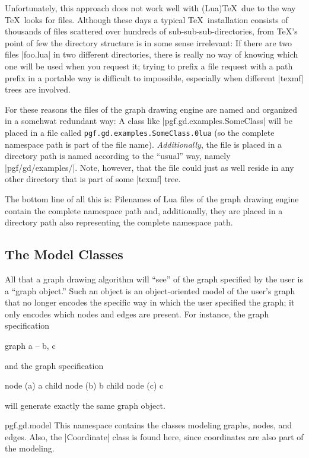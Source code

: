Unfortunately, this approach does not work well with (Lua)\TeX\ due to
the way \TeX\ looks for files. Although these days a typical \TeX\
installation consists of thousands of files scattered over hundreds of
sub-sub-sub-directories, from \TeX's point of few the directory
structure is in some sense irrelevant: If there are two files
|foo.lua| in two different directories, there is really no way of
knowing which one will be used when you request it; trying to prefix a
file request with a path prefix in a portable way is difficult to
impossible, especially when different |texmf| trees are involved.

For these reasons the files of the graph drawing engine are named and
organized in a somehwat redundant way: A class like
|pgf.gd.examples.SomeClass| will be placed in a file called
\texttt{pgf.gd.examples.SomeClass.\penalty0lua} (so the complete namespace path is
part of the file name). \emph{Additionally}, the file is placed in a
directory path is named according to the ``usual'' way, namely
|pgf/gd/examples/|. Note, however, that the file could just as well
reside in any other directory that is part of some |texmf| tree.

The bottom line of all this is: Filenames of Lua files of the graph
drawing engine contain the complete namespace path and, additionally,
they are placed in a directory path also representing the complete
namespace path. 


\subsection{The Model Classes}

\label{section-gd-models}

All that a graph drawing algorithm will ``see'' of the graph specified
by the user is a ``graph object.'' Such an object is an
object-oriented model of the user's graph that no longer encodes the
specific way in which the user specified the graph; it only encodes
which nodes and edges are present. For instance, the graph
specification 
\begin{codeexample}
graph { a -- {b, c} }
\end{codeexample}
\noindent and the graph specification
\begin{codeexample}
node (a) { a }
child { node (b) {b} }
child { node (c) {c} }
\end{codeexample}
will generate exactly the same graph object.

\begin{luanamespace}{pgf.gd.}{model}
  This namespace contains the classes modeling graphs,
  nodes, and edges. Also, the |Coordinate| class is found here, since
  coordinates are also part of the modeling.  
\end{luanamespace}

